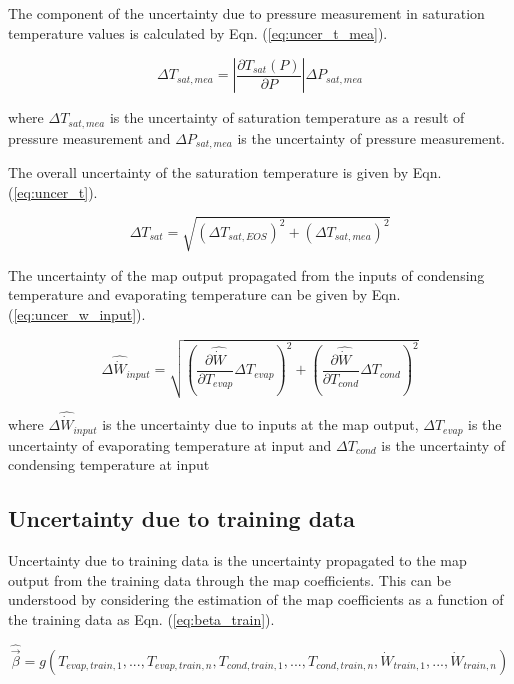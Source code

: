 The component of the uncertainty due to pressure measurement in saturation temperature values is calculated by Eqn. (\ref{eq:uncer_t_mea}).

\begin{equation}
\Delta {T_{sat,mea}} = \left|\frac{{\partial {T_{sat}}({P})}}{{\partial {P}}}\right|\Delta {P_{sat,mea}}
\label{eq:uncer_t_mea}
\end{equation}

where $\Delta {T_{sat,mea}}$ is the uncertainty of saturation temperature as a result of pressure measurement and $\Delta P_{sat,mea}$ is the uncertainty of pressure measurement.

The overall uncertainty of the saturation temperature is given by Eqn. (\ref{eq:uncer_t}).

\begin{equation}
\Delta {T_{sat}} = \sqrt {{{(\Delta {T_{sat,EOS}})}^2} + {{(\Delta {T_{sat,mea}})}^2}}
\label{eq:uncer_t}
\end{equation}

The uncertainty of the map output propagated from the inputs of condensing temperature and evaporating temperature can be given by Eqn. (\ref{eq:uncer_w_input}).

\begin{equation}
\Delta {\hat{\dot{W}}_{input}} = \sqrt {{\left(\frac{{\partial \hat{\dot{W}}}}{{\partial {T_{evap}}}}\Delta {T_{evap}}\right)^2} + {\left(\frac{{\partial \hat{\dot{W}}}}{{\partial {T_{cond}}}}\Delta {T_{cond}}\right)^2}}
\label{eq:uncer_w_input}
\end{equation}

where $\Delta {\hat{\dot{W}}_{input}}$ is the uncertainty due to inputs at the map output, $\Delta {T_{evap}}$ is the uncertainty of evaporating temperature at input and $\Delta T_{cond}$ is the uncertainty of condensing temperature at input

\subsection{Uncertainty due to training data} \label{subsec:uncer_train}
Uncertainty due to training data is the uncertainty propagated to the map output from the training data through the map coefficients. This can be understood by considering the estimation of the map coefficients as a function of the training data as Eqn. (\ref{eq:beta_train}).

\begin{equation}
\hat{ \vec {\beta}}  = g({T_{evap,train,1}},...,{T_{evap,train,n}},{T_{cond,train,1}},...,{T_{cond,train,n}},{\dot{W}_{train,1}},...,{\dot{W}_{train,n}})
\label{eq:beta_train}
\end{equation}

